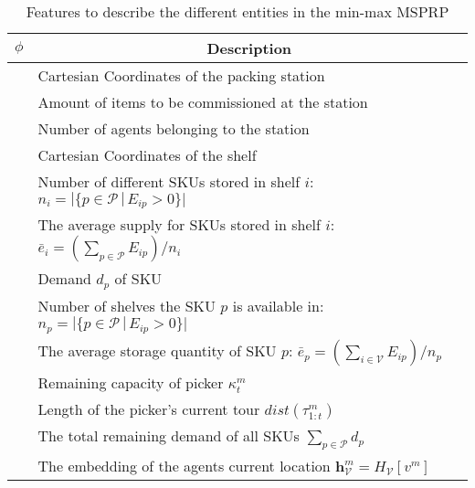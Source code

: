 \begin{table}[H]
\centering
\setlength\tabcolsep{5pt}
\caption{Features to describe the different entities in the min-max MSPRP}
\label{tab:features}
\renewcommand{\arraystretch}{1.1}
\begin{tabular}{p{0.4cm}|l}
\hline
\multicolumn{1}{c|}{$\phi$} & \multicolumn{1}{c}{Description} \\
\hline
\parbox[t]{2mm}{} & Cartesian Coordinates of the packing station \\
& Amount of items to be commissioned at the station \\  
& Number of agents belonging to the station \\
\hline
\parbox[t]{2mm}{} & Cartesian Coordinates of the shelf \\
& Number of different SKUs stored in shelf $i$: $n_i = |\{p \in \mathcal{P} \, | \, E_{ip} > 0 \}|$ \\
& The average supply for SKUs stored in shelf $i$: $\bar{e}_i = (\sum_{p \in \mathcal{P}} E_{ip}) / n_i  $ \\
\hline
\parbox[t]{2mm}{} 
& Demand $d_p$ of SKU \\
& Number of shelves the SKU $p$ is available in: $n_p = |\{p \in \mathcal{P} \, | \, E_{ip} > 0 \}|$ \\
& The average storage quantity of SKU $p$: $\bar{e}_p = (\sum_{i \in \mathcal{V}} E_{ip}) / n_p  $ \\
\hline
\parbox[t]{2mm}{} 
& Remaining capacity of picker $\kappa^m_t$ \\
& Length of the picker's current tour $dist(\tau^m_{1:t})$ \\
& The total remaining demand of all SKUs $\sum_{p \in \mathcal{P}} d_p$ \\
& The embedding of the agents current location $\bm{h}_\mathcal{V}^m = H_\mathcal{V}[v^m]$ \\
\hline
\end{tabular}
\end{table}